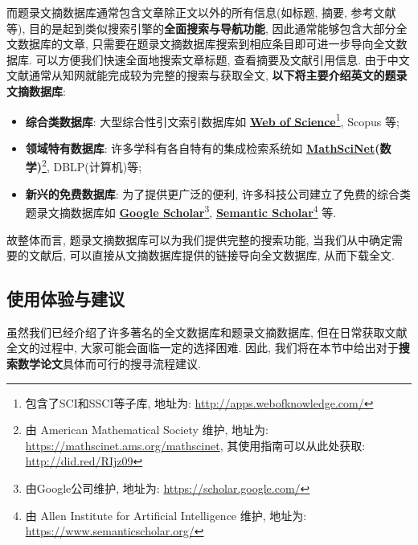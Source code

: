 \documentclass{formatBook}
\begin{document}
而题录文摘数据库通常包含文章除正文以外的所有信息(如标题, 摘要, 参考文献等), 目的是起到类似搜索引擎的\textbf{全面搜索与导航功能}, 因此通常能够包含大部分全文数据库的文章,  只需要在题录文摘数据库搜索到相应条目即可进一步导向全文数据库. 可以方便我们快速全面地搜索文章标题, 查看摘要及文献引用信息. 由于中文文献通常从知网就能完成较为完整的搜索与获取全文, \textbf{以下将主要介绍英文的题录文摘数据库}:
\begin{itemize}
    \item \textbf{综合类数据库}: 大型综合性引文索引数据库如 \textbf{\href{http://apps.webofknowledge.com/}{Web of Science}}\footnote{包含了SCI和SSCI等子库, 地址为: \url{http://apps.webofknowledge.com/}}, Scopus 等;
    \item \textbf{领域特有数据库}: 许多学科有各自特有的集成检索系统如 \textbf{\href{https://mathscinet.ams.org/mathscinet}{MathSciNet}(数学)}\footnote{由 American Mathematical Society 维护, 地址为: \url{https://mathscinet.ams.org/mathscinet}, 其使用指南可以从此处获取: \url{http://did.red/RIjz09}}, DBLP(计算机)等;
    \item \textbf{新兴的免费数据库}: 为了提供更广泛的便利, 许多科技公司建立了免费的综合类题录文摘数据库如 \textbf{\href{https://scholar.google.com/}{Google Scholar}}\footnote{由Google公司维护, 地址为: \url{https://scholar.google.com/}}, \textbf{\href{https://www.semanticscholar.org/}{Semantic Scholar}}\footnote{由 Allen Institute for Artificial Intelligence 维护, 地址为: \url{https://www.semanticscholar.org/}} 等.
\end{itemize}

故整体而言, 题录文摘数据库可以为我们提供完整的搜索功能, 当我们从中确定需要的文献后, 可以直接从文摘数据库提供的链接导向全文数据库, 从而下载全文.

\subsection{使用体验与建议}
虽然我们已经介绍了许多著名的全文数据库和题录文摘数据库, 但在日常获取文献全文的过程中, 大家可能会面临一定的选择困难. 因此, 我们将在本节中给出对于\textbf{搜索数学论文}具体而可行的搜寻流程建议.
\end{document}
